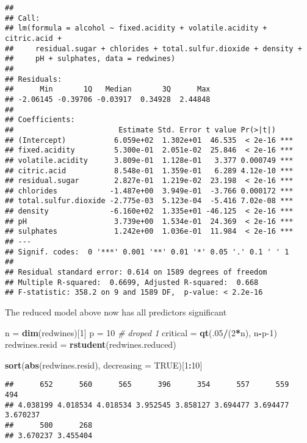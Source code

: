 \documentclass[
]{article}
\newenvironment{Shaded}{\begin{snugshade}}{\end{snugshade}}
\newcommand{\CommentTok}[1]{\textcolor[rgb]{0.56,0.35,0.01}{\textit{#1}}}
\newcommand{\DataTypeTok}[1]{\textcolor[rgb]{0.13,0.29,0.53}{#1}}
\newcommand{\DecValTok}[1]{\textcolor[rgb]{0.00,0.00,0.81}{#1}}
\newcommand{\KeywordTok}[1]{\textcolor[rgb]{0.13,0.29,0.53}{\textbf{#1}}}
\newcommand{\NormalTok}[1]{#1}
\newcommand{\OperatorTok}[1]{\textcolor[rgb]{0.81,0.36,0.00}{\textbf{#1}}}
\newcommand{\OtherTok}[1]{\textcolor[rgb]{0.56,0.35,0.01}{#1}}
\newcommand{\StringTok}[1]{\textcolor[rgb]{0.31,0.60,0.02}{#1}}
\begin{document}
\begin{verbatim}
## 
## Call:
## lm(formula = alcohol ~ fixed.acidity + volatile.acidity + citric.acid + 
##     residual.sugar + chlorides + total.sulfur.dioxide + density + 
##     pH + sulphates, data = redwines)
## 
## Residuals:
##      Min       1Q   Median       3Q      Max 
## -2.06145 -0.39706 -0.03917  0.34928  2.44848 
## 
## Coefficients:
##                        Estimate Std. Error t value Pr(>|t|)    
## (Intercept)           6.059e+02  1.302e+01  46.535  < 2e-16 ***
## fixed.acidity         5.300e-01  2.051e-02  25.846  < 2e-16 ***
## volatile.acidity      3.809e-01  1.128e-01   3.377 0.000749 ***
## citric.acid           8.548e-01  1.359e-01   6.289 4.12e-10 ***
## residual.sugar        2.827e-01  1.219e-02  23.198  < 2e-16 ***
## chlorides            -1.487e+00  3.949e-01  -3.766 0.000172 ***
## total.sulfur.dioxide -2.775e-03  5.123e-04  -5.416 7.02e-08 ***
## density              -6.160e+02  1.335e+01 -46.125  < 2e-16 ***
## pH                    3.739e+00  1.534e-01  24.369  < 2e-16 ***
## sulphates             1.242e+00  1.036e-01  11.984  < 2e-16 ***
## ---
## Signif. codes:  0 '***' 0.001 '**' 0.01 '*' 0.05 '.' 0.1 ' ' 1
## 
## Residual standard error: 0.614 on 1589 degrees of freedom
## Multiple R-squared:  0.6699, Adjusted R-squared:  0.668 
## F-statistic: 358.2 on 9 and 1589 DF,  p-value: < 2.2e-16
\end{verbatim}

The reduced model above now has all predictors significant

\begin{Shaded}
\begin{Highlighting}[]
\NormalTok{n =}\StringTok{ }\KeywordTok{dim}\NormalTok{(redwines)[}\DecValTok{1}\NormalTok{]}
\NormalTok{p =}\StringTok{ }\DecValTok{10} \CommentTok{# droped 1}
\NormalTok{critical =}\StringTok{ }\KeywordTok{qt}\NormalTok{(.}\DecValTok{05}\OperatorTok{/}\NormalTok{(}\DecValTok{2}\OperatorTok{*}\NormalTok{n), n}\OperatorTok{-}\NormalTok{p}\DecValTok{-1}\NormalTok{)}
\NormalTok{redwines.resid =}\StringTok{ }\KeywordTok{rstudent}\NormalTok{(redwines.reduced)}

\KeywordTok{sort}\NormalTok{(}\KeywordTok{abs}\NormalTok{(redwines.resid), }\DataTypeTok{decreasing =} \OtherTok{TRUE}\NormalTok{)[}\DecValTok{1}\OperatorTok{:}\DecValTok{10}\NormalTok{]}
\end{Highlighting}
\end{Shaded}

\begin{verbatim}
##      652      560      565      396      354      557      559      494 
## 4.038199 4.018534 4.018534 3.952545 3.858127 3.694477 3.694477 3.670237 
##      500      268 
## 3.670237 3.455404
\end{verbatim}
\end{document}
